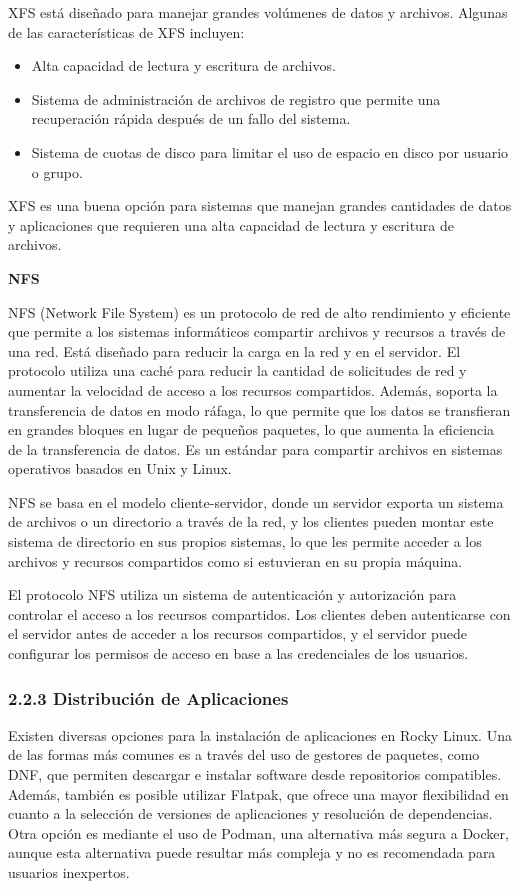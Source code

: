 \begin{spacing}{1.5}
    XFS está diseñado para manejar grandes volúmenes de datos y archivos. Algunas de las características de XFS incluyen:

    \begin{itemize}
        \item Alta capacidad de lectura y escritura de archivos.
        \item Sistema de administración de archivos de registro que permite una recuperación rápida después de un fallo del sistema.
        \item Sistema de cuotas de disco para limitar el uso de espacio en disco por usuario o grupo.
    \end{itemize}

    XFS es una buena opción para sistemas que manejan grandes cantidades de datos y aplicaciones que requieren una alta capacidad de lectura y escritura de archivos. \cite{RHEL-XFS-1}

    \textbf{NFS}
    
    NFS (Network File System) es un protocolo de red de alto rendimiento y eficiente que permite a los sistemas informáticos compartir archivos y recursos a través de una red. Está diseñado para reducir la carga en la red y en el servidor. El protocolo utiliza una caché para reducir la cantidad de solicitudes de red y aumentar la velocidad de acceso a los recursos compartidos. Además, soporta la transferencia de datos en modo ráfaga, lo que permite que los datos se transfieran en grandes bloques en lugar de pequeños paquetes, lo que aumenta la eficiencia de la transferencia de datos. Es un estándar para compartir archivos en sistemas operativos basados en Unix y Linux.

    NFS se basa en el modelo cliente-servidor, donde un servidor exporta un sistema de archivos o un directorio a través de la red, y los clientes pueden montar este sistema de directorio en sus propios sistemas, lo que les permite acceder a los archivos y recursos compartidos como si estuvieran en su propia máquina.

    El protocolo NFS utiliza un sistema de autenticación y autorización para controlar el acceso a los recursos compartidos. Los clientes deben autenticarse con el servidor antes de acceder a los recursos compartidos, y el servidor puede configurar los permisos de acceso en base a las credenciales de los usuarios. \cite{RHEL-NFS-1} \cite{RHEL-NFS-2}

    \subsubsection{2.2.3 Distribución de Aplicaciones}
    Existen diversas opciones para la instalación de aplicaciones en Rocky Linux. Una de las formas más comunes es a través del uso de gestores de paquetes, como DNF, que permiten descargar e instalar software desde repositorios compatibles. Además, también es posible utilizar Flatpak, que ofrece una mayor flexibilidad en cuanto a la selección de versiones de aplicaciones y resolución de dependencias. Otra opción es mediante el uso de Podman, una alternativa más segura a Docker, aunque esta alternativa puede resultar más compleja y no es recomendada para usuarios inexpertos.


\end{spacing}
